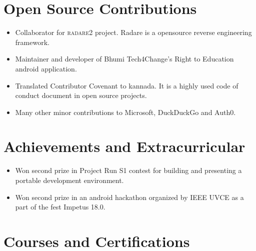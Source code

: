 \documentclass[12pt,a4paper,sans]{moderncv}
\begin{document}

\section{Open Source Contributions}
\begin{itemize}
\item [\textbullet] Collaborator for \textsc{radare2} project. Radare is a opensource reverse engineering framework.
\item [\textbullet] Maintainer and developer of  Bhumi Tech4Change's Right to Education android application.
\item [\textbullet] Translated Contributor Covenant to kannada. It is a highly used code of conduct document in open source projects.
\item [\textbullet] Many other minor contributions to Microsoft, DuckDuckGo and Auth0.
\end{itemize}
	
\section{Achievements and Extracurricular}

\begin{itemize}
	\item[\textbullet] Won second prize in Project Run S1 contest for building and presenting a portable development environment.
	\item[\textbullet] Won second prize in an android hackathon organized by IEEE UVCE as a part of the fest Impetus 18.0.

\end{itemize}

	
\section{Courses and Certifications}


\end{document}
